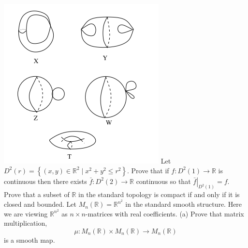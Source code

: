 \documentclass[10pt]{article}
\begin{document}
\includegraphics[max width=\textwidth]{2022-05-23 20_49_52-topology_merge.png}
\newpage
Let $D^{2}(r)=\left\{(x, y) \in \mathbb{R}^{2} \mid x^{2}+y^{2} \leq r^{2}\right\}$. Prove that if $f: D^{2}(1) \rightarrow \mathbb{R}$ is continuous then there exists $\bar{f}: D^{2}(2) \rightarrow \mathbb{R}$ continuous so that $\left.\bar{f}\right|_{D^{2}(1)}=f$.
\newpage
Prove that a subset of $\mathbb{R}$ in the standard topology is compact if and only if it is closed and bounded.
\newpage
\newpage
Let $M_{n}(\mathbb{R})=\mathbb{R}^{n^{2}}$ in the standard smooth structure. Here we are viewing $\mathbb{R}^{n^{2}}$ as $n \times n$-matrices with real coefficients.
(a) Prove that matrix multiplication,
$$
\mu: M_{n}(\mathbb{R}) \times M_{n}(\mathbb{R}) \rightarrow M_{n}(\mathbb{R})
$$
is a smooth map.
\end{document}
